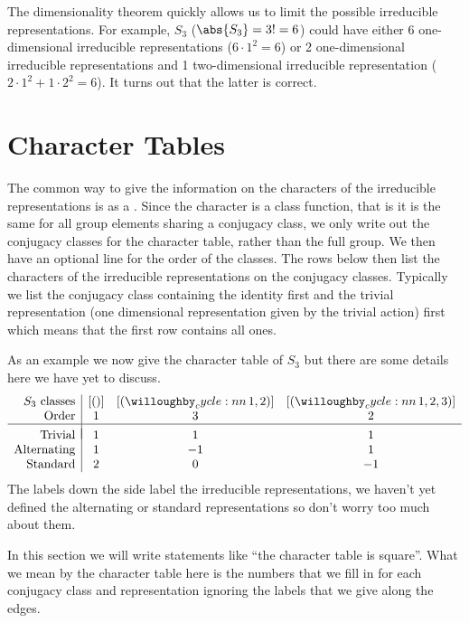 \documentclass[fleqn]{NotesClass}
\begin{document}
    The dimensionality theorem quickly allows us to limit the possible irreducible representations.
    For example, \(S_3\) (\(\abs{S_3} = 3! = 6\)) could have either 6 one-dimensional irreducible representations (\(6 \cdot 1^2 = 6\)) or 2 one-dimensional irreducible representations and 1 two-dimensional irreducible representation (\(2 \cdot 1^2 + 1\cdot 2^2 = 6\)).
    It turns out that the latter is correct.
    
    \section{Character Tables}
    The common way to give the information on the characters of the irreducible representations is as a .
    Since the character is a class function, that is it is the same for all group elements sharing a conjugacy class, we only write out the conjugacy classes for the character table, rather than the full group.
    We then have an optional line for the order of the classes.
    The rows below then list the characters of the irreducible representations on the conjugacy classes.
    Typically we list the conjugacy class containing the identity first and the trivial representation (one dimensional representation given by the trivial action) first which means that the first row contains all ones.
    
    As an example we now give the character table of \(S_3\) but there are some details here we have yet to discuss.
    \begin{equation}
        \begin{array}{r|ccc}
            S_3\text{ classes} & [()] & [\cycle{1,2}] & [\cycle{1,2,3}] \\
            \text{Order} & 1 & 3 & 2 \\ \hline 
            & & & \\[-2ex]
            \text{Trivial} & 1 & 1 & 1 \\
            \text{Alternating} & 1 & -1 & 1 \\
            \text{Standard} & 2 & 0 & -1 \\
        \end{array}
    \end{equation}
    The labels down the side label the irreducible representations, we haven't yet defined the alternating or standard representations so don't worry too much about them.
    
    In this section we will write statements like \enquote{the character table is square}.
    What we mean by the character table here is the numbers that we fill in for each conjugacy class and representation ignoring the labels that we give along the edges.
    
\end{document}
